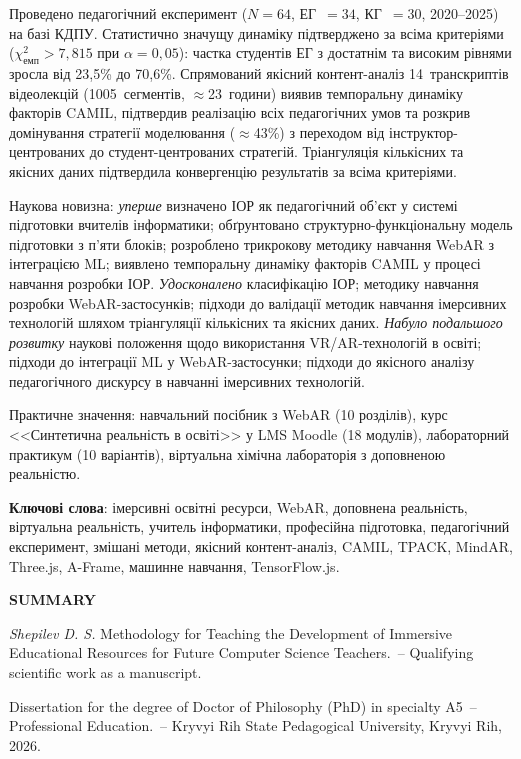 Проведено педагогічний експеримент ($N = 64$, ЕГ~$= 34$, КГ~$= 30$, 2020--2025) на базі КДПУ. Статистично значущу динаміку підтверджено за всіма критеріями ($\chi^2_{\text{емп}} > 7{,}815$ при $\alpha = 0{,}05$): частка студентів ЕГ з достатнім та високим рівнями зросла від 23,5\% до 70,6\%. Спрямований якісний контент-аналіз 14~транскриптів відеолекцій (1005~сегментів, $\approx$23~години) виявив темпоральну динаміку факторів CAMIL, підтвердив реалізацію всіх педагогічних умов та розкрив домінування стратегії моделювання ($\approx$43\%) з переходом від інструктор-центрованих до студент-центрованих стратегій. Тріангуляція кількісних та якісних даних підтвердила конвергенцію результатів за всіма критеріями.

Наукова новизна: \textit{уперше} визначено ІОР як педагогічний об'єкт у системі підготовки вчителів інформатики; обґрунтовано структурно-функціональну модель підготовки з п'яти блоків; розроблено трикрокову методику навчання WebAR з інтеграцією ML; виявлено темпоральну динаміку факторів CAMIL у процесі навчання розробки ІОР. \textit{Удосконалено} класифікацію ІОР; методику навчання розробки WebAR-застосунків; підходи до валідації методик навчання імерсивних технологій шляхом тріангуляції кількісних та якісних даних. \textit{Набуло подальшого розвитку} наукові положення щодо використання VR/AR-технологій в освіті; підходи до інтеграції ML у WebAR-застосунки; підходи до якісного аналізу педагогічного дискурсу в навчанні імерсивних технологій.

Практичне значення: навчальний посібник з WebAR (10 розділів), курс <<Синтетична реальність в освіті>> у LMS Moodle (18 модулів), лабораторний практикум (10 варіантів), віртуальна хімічна лабораторія з доповненою реальністю.

\textbf{Ключові слова}: імерсивні освітні ресурси, WebAR, доповнена реальність, віртуальна реальність, учитель інформатики, професійна підготовка, педагогічний експеримент, змішані методи, якісний контент-аналіз, CAMIL, TPACK, MindAR, Three.js, A-Frame, машинне навчання, TensorFlow.js.

\begin{center}
{\large \textbf{SUMMARY}}
\end{center}

\textit{Shepilev D. S.} Methodology for Teaching the Development of Immersive Educational Resources for Future Computer Science Teachers.~-- Qualifying scientific work as a manuscript.

Dissertation for the degree of Doctor of Philosophy (PhD) in specialty A5~-- Professional Education.~-- Kryvyi Rih State Pedagogical University, Kryvyi Rih, 2026.\\


